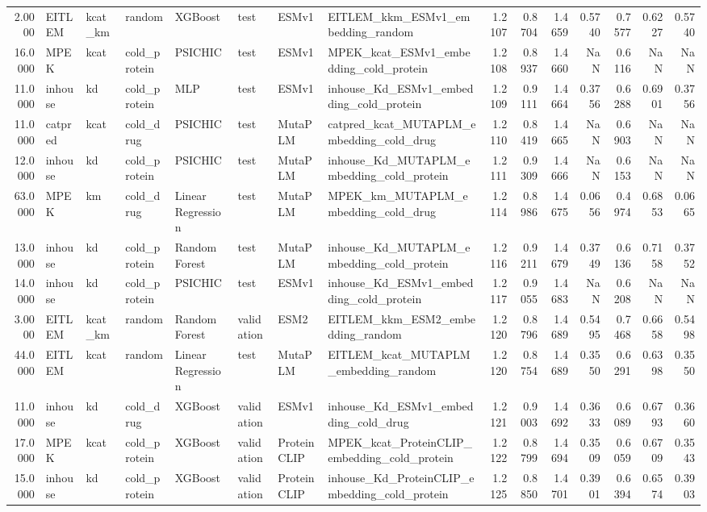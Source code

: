 \begin{tabular}{rlllllllrrrrrrr}
2.0000 & EITLEM & kcat_km & random & XGBoost & test & ESMv1 & EITLEM_kkm_ESMv1_embedding_random & 1.2107 & 0.8704 & 1.4659 & 0.5740 & 0.7577 & 0.6227 & 0.5740 \\
16.0000 & MPEK & kcat & cold_protein & PSICHIC & test & ESMv1 & MPEK_kcat_ESMv1_embedding_cold_protein & 1.2108 & 0.8937 & 1.4660 & NaN & 0.6116 & NaN & NaN \\
11.0000 & inhouse & kd & cold_protein & MLP & test & ESMv1 & inhouse_Kd_ESMv1_embedding_cold_protein & 1.2109 & 0.9111 & 1.4664 & 0.3756 & 0.6288 & 0.6901 & 0.3756 \\
11.0000 & catpred & kcat & cold_drug & PSICHIC & test & MutaPLM & catpred_kcat_MUTAPLM_embedding_cold_drug & 1.2110 & 0.8419 & 1.4665 & NaN & 0.6903 & NaN & NaN \\
12.0000 & inhouse & kd & cold_protein & PSICHIC & test & MutaPLM & inhouse_Kd_MUTAPLM_embedding_cold_protein & 1.2111 & 0.9309 & 1.4666 & NaN & 0.6153 & NaN & NaN \\
63.0000 & MPEK & km & cold_drug & Linear Regression & test & MutaPLM & MPEK_km_MUTAPLM_embedding_cold_drug & 1.2114 & 0.8986 & 1.4675 & 0.0656 & 0.4974 & 0.6853 & 0.0665 \\
13.0000 & inhouse & kd & cold_protein & Random Forest & test & MutaPLM & inhouse_Kd_MUTAPLM_embedding_cold_protein & 1.2116 & 0.9211 & 1.4679 & 0.3749 & 0.6136 & 0.7158 & 0.3752 \\
14.0000 & inhouse & kd & cold_protein & PSICHIC & test & ESMv1 & inhouse_Kd_ESMv1_embedding_cold_protein & 1.2117 & 0.9055 & 1.4683 & NaN & 0.6208 & NaN & NaN \\
3.0000 & EITLEM & kcat_km & random & Random Forest & validation & ESM2 & EITLEM_kkm_ESM2_embedding_random & 1.2120 & 0.8796 & 1.4689 & 0.5495 & 0.7468 & 0.6658 & 0.5498 \\
44.0000 & EITLEM & kcat & random & Linear Regression & test & MutaPLM & EITLEM_kcat_MUTAPLM_embedding_random & 1.2120 & 0.8754 & 1.4689 & 0.3550 & 0.6291 & 0.6398 & 0.3550 \\
11.0000 & inhouse & kd & cold_drug & XGBoost & validation & ESMv1 & inhouse_Kd_ESMv1_embedding_cold_drug & 1.2121 & 0.9003 & 1.4692 & 0.3633 & 0.6089 & 0.6793 & 0.3660 \\
17.0000 & MPEK & kcat & cold_protein & XGBoost & validation & ProteinCLIP & MPEK_kcat_ProteinCLIP_embedding_cold_protein & 1.2122 & 0.8799 & 1.4694 & 0.3509 & 0.6059 & 0.6709 & 0.3543 \\
15.0000 & inhouse & kd & cold_protein & XGBoost & validation & ProteinCLIP & inhouse_Kd_ProteinCLIP_embedding_cold_protein & 1.2125 & 0.8850 & 1.4701 & 0.3901 & 0.6394 & 0.6574 & 0.3903 \\

\end{tabular}
